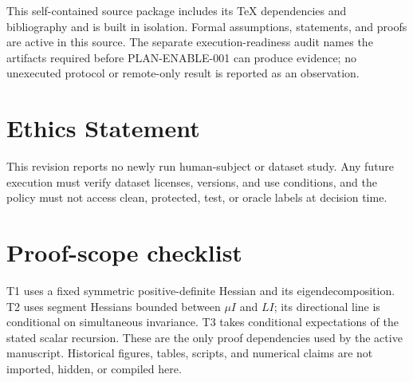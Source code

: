 \documentclass{article}
\begin{document}
This self-contained source package includes its TeX dependencies and
bibliography and is built in isolation. Formal assumptions, statements, and
proofs are active in this source. The separate execution-readiness audit names
the artifacts required before PLAN-ENABLE-001 can produce evidence; no
unexecuted protocol or remote-only result is reported as an observation.

\section*{Ethics Statement}

This revision reports no newly run human-subject or dataset study. Any future
execution must verify dataset licenses, versions, and use conditions, and the
policy must not access clean, protected, test, or oracle labels at decision
time.






\appendix
\section{Proof-scope checklist}

T1 uses a fixed symmetric positive-definite Hessian and its eigendecomposition.
T2 uses segment Hessians bounded between $\mu I$ and $LI$; its directional
line is conditional on simultaneous invariance. T3 takes conditional
expectations of the stated scalar recursion. These are the only proof
dependencies used by the active manuscript. Historical figures, tables,
scripts, and numerical claims are not imported, hidden, or compiled here.
\end{document}
